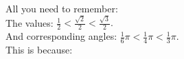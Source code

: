 \documentclass[preview]{standalone}
\begin{document}
\begin{center}
All you need to remember: \\ The values: $\frac{1}{2} < \frac{\sqrt{2}}{2} < \frac{\sqrt{3}}{2}.$ \\ And corresponding angles: $ \frac{1}{6} \pi < \frac{1}{4} \pi < \frac{1}{3} \pi. $ \\ This is because:
\end{center}
\end{document}
